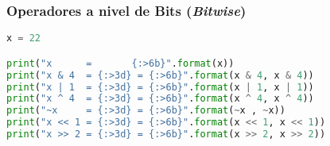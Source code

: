 \begin{frame}[fragile]
  \frametitle{Operadores a nivel de Bits (\emph{Bitwise})}

  \begin{lstlisting}[language=Python]
x = 22

print("x      =       {:>6b}".format(x))
print("x & 4  = {:>3d} = {:>6b}".format(x & 4, x & 4))
print("x | 1  = {:>3d} = {:>6b}".format(x | 1, x | 1))
print("x ^ 4  = {:>3d} = {:>6b}".format(x ^ 4, x ^ 4))
print("~x     = {:>3d} = {:>6b}".format(~x , ~x))
print("x << 1 = {:>3d} = {:>6b}".format(x << 1, x << 1))
print("x >> 2 = {:>3d} = {:>6b}".format(x >> 2, x >> 2))
  \end{lstlisting}
\end{frame}
